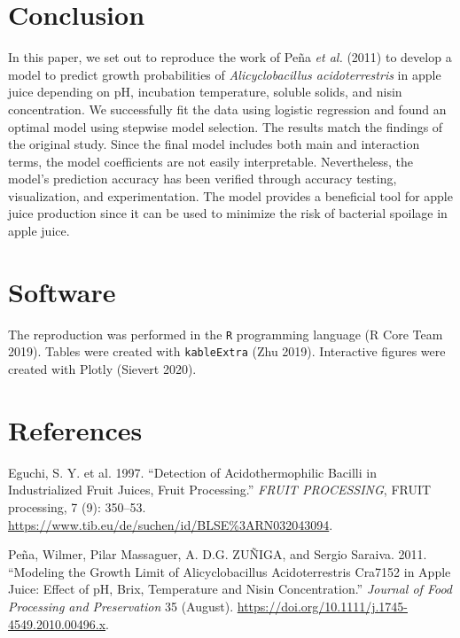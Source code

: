 \documentclass[
  12pt,
]{article}
\begin{document}
\hypertarget{conclusion}{%
\section{Conclusion}\label{conclusion}}

In this paper, we set out to reproduce the work of Peña \emph{et al.}
(2011) to develop a model to predict growth probabilities of
\emph{Alicyclobacillus acidoterrestris} in apple juice depending on pH,
incubation temperature, soluble solids, and nisin concentration. We
successfully fit the data using logistic regression and found an optimal
model using stepwise model selection. The results match the findings of
the original study. Since the final model includes both main and
interaction terms, the model coefficients are not easily interpretable.
Nevertheless, the model's prediction accuracy has been verified through
accuracy testing, visualization, and experimentation. The model provides
a beneficial tool for apple juice production since it can be used to
minimize the risk of bacterial spoilage in apple juice.

\hypertarget{software}{%
\section{Software}\label{software}}

The reproduction was performed in the \texttt{R} programming language (R
Core Team 2019). Tables were created with \texttt{kableExtra} (Zhu
2019). Interactive figures were created with Plotly (Sievert 2020).

\hypertarget{references}{%
\section*{References}\label{references}}

\hypertarget{refs}{}
\leavevmode\hypertarget{ref-eguchi}{}%
Eguchi, S. Y. et al. 1997. ``Detection of Acidothermophilic Bacilli in
Industrialized Fruit Juices, Fruit Processing.'' \emph{FRUIT
PROCESSING}, FRUIT processing, 7 (9): 350--53.
\url{https://www.tib.eu/de/suchen/id/BLSE\%3ARN032043094}.

\leavevmode\hypertarget{ref-pena}{}%
Peña, Wilmer, Pilar Massaguer, A. D.G. ZUÑIGA, and Sergio Saraiva. 2011.
``Modeling the Growth Limit of Alicyclobacillus Acidoterrestris Cra7152
in Apple Juice: Effect of pH, Brix, Temperature and Nisin
Concentration.'' \emph{Journal of Food Processing and Preservation} 35
(August). \url{https://doi.org/10.1111/j.1745-4549.2010.00496.x}.
\end{document}
